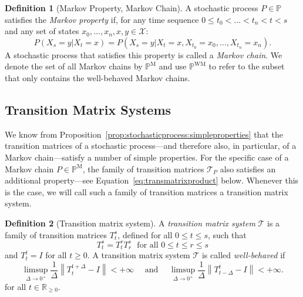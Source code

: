 \documentclass[10pt]{paper}
\theoremstyle{definition}
\newtheorem{definition}{Definition}
\newcommand{\reals}{\mathbb{R}}
\newcommand{\states}{\mathcal{X}}
\newcommand{\processes}{\mathbb{P}}
\newcommand{\mprocesses}{\processes^{\mathrm{M}}}
\newcommand{\wmprocesses}{\processes^{\mathrm{WM}}}
\newcommand{\norm}[1]{\left\lVert #1 \right\rVert}
\begin{document}
\begin{definition}[Markov Property, Markov Chain]\label{def:markov_property}
A stochastic process $P\in\processes$ satisfies the \emph{Markov property} if, for any time sequence $0\leq t_0<\dots<t_{n}<t<s$ and any set of states $x_{0},\dots,x_{n},x,y\in\states$:
\begin{equation*}
P(X_s=y\vert X_{t}=x)=P(X_s=y\vert X_t=x, X_{t_0}=x_{0}, \dots, X_{t_n}=x_{n}).
\end{equation*}
A stochastic process that satisfies this property is called a \emph{Markov chain}. We denote the set of all Markov chains by $\mprocesses$ and use $\wmprocesses$ to refer to the subset that only contains the well-behaved Markov chains.
\end{definition}

\subsection{Transition Matrix Systems}\label{sec:trans_mat_systems}

We know from Proposition~\ref{prop:stochasticprocess:simpleproperties} that the transition matrices of a stochastic process---and therefore also, in particular, of a Markov chain---satisfy a number of simple properties. For the specific case of a Markov chain $P\in\mprocesses$, the family of transition matrices $\mathcal{T}_P$ also satisfies an additional property---see Equation~\eqref{eq:transmatrixproduct} below. Whenever this is the case, we will call such a family of transition matrices a transition matrix system.

\begin{definition}[Transition matrix system]\label{def:trans_mat_system}
A \emph{transition matrix system} $\mathcal{T}$ is a family of transition matrices $T_t^s$, defined for all $0\leq t\leq s$, such that
\begin{equation}\label{eq:transmatrixproduct}
T_t^s=T_t^r T_r^s
\text{~~for all $0\leq t\leq r\leq s$}
\end{equation}
and $T_t^t=I$ for all $t\geq0$. A transition matrix system  $\mathcal{T}$ is called \emph{well-behaved} if 
\begin{equation}\label{eq:wellbehavedtransitionmatrixsystem}%
\limsup_{\Delta\to 0^{+}}\frac{1}{\Delta}\norm{T_{t}^{t+\Delta}-I}<+\infty
\text{~~~~and~~~~}
\limsup_{\Delta\to 0^{+}}\frac{1}{\Delta}\norm{T_{t-\Delta}^t-I}<+\infty.
\end{equation}
for all $t\in\reals_{\geq0}$.
\end{definition}
\end{document}
